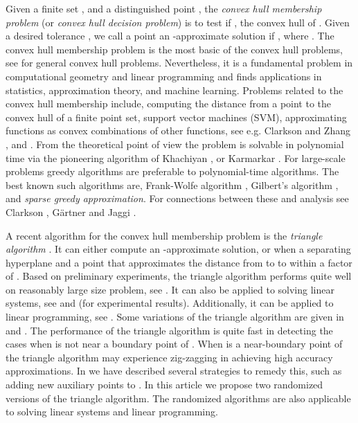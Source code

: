 \documentclass{article}
\theoremstyle{definition}
\begin{document}
Given a finite set , and a distinguished point , the {\it convex hull membership problem} (or {\it convex hull decision problem}) is to test if , the convex hull of . Given a desired tolerance , we call a point  an -approximate solution if , where . The convex hull membership problem is the most basic of the convex hull problems, see \cite{Goodman} for general convex hull problems. Nevertheless, it is a fundamental problem in computational geometry and linear programming and finds applications in statistics, approximation theory, and machine learning. Problems related to the convex hull membership include, computing the distance from a point to the convex hull of a finite point set,
support vector machines (SVM), approximating functions as convex combinations of other functions, see e.g. Clarkson \cite{clark2008} and Zhang \cite{zhang}, and \cite{kal14}. From the theoretical point of view the problem is solvable in polynomial time via the pioneering algorithm of Khachiyan  \cite{kha79}, or  Karmarkar \cite{kar84}.  For  large-scale problems greedy algorithms are preferable to polynomial-time algorithms. The best known such algorithms are, Frank-Wolfe algorithm \cite{Frank}, Gilbert's algorithm \cite{Gilbert}, and {\it sparse greedy approximation}. For connections between these and analysis  see  Clarkson \cite{clark2008},  G{\"a}rtner and Jaggi \cite{Gartner}.

A recent algorithm for the convex hull membership  problem is the {\it triangle algorithm} \cite{kal14}. It can either compute an -approximate solution, or when  a separating hyperplane and a point that approximates the distance from  to  to within a factor of .
Based on preliminary experiments, the triangle algorithm performs quite well on reasonably large size problem, see \cite{Meng}. It can also be applied to solving linear systems, see \cite{kal12a} and \cite{Gibson} (for experimental results). Additionally, it can be applied to linear programming, see \cite{kal14}. Some variations of the triangle algorithm are given in \cite{kal12a} and \cite{kalSaks}.  The performance of the triangle algorithm is quite fast in detecting the cases when  is not near a boundary point of .  When  is a near-boundary point of  the triangle algorithm  may experience zig-zagging in achieving high accuracy approximations.  In \cite{kal14} we have described several strategies to remedy this, such as adding new auxiliary points to .  In this article  we propose two randomized versions of the triangle algorithm. The  randomized algorithms are also applicable to solving linear systems and linear programming.
\end{document}
